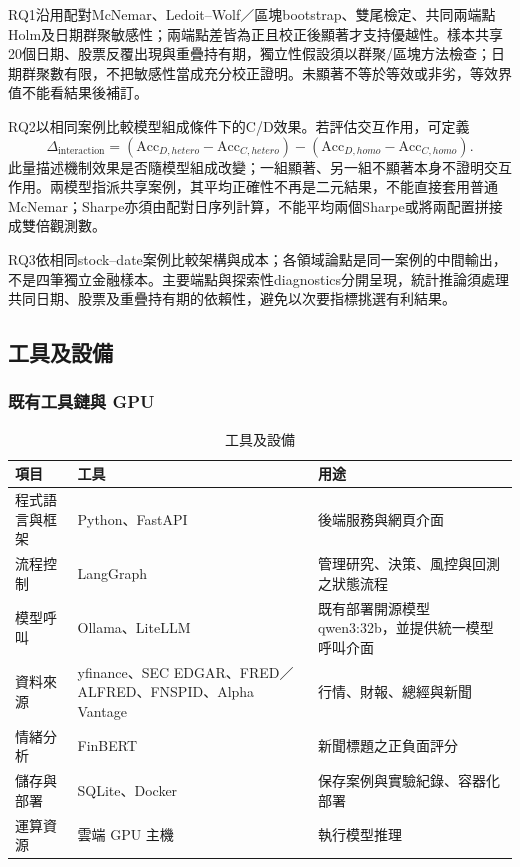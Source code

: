 \documentclass[12pt,a4paper]{article}
\begin{document}
\begin{CJK}{UTF8}{bkai}
RQ1沿用配對McNemar、Ledoit--Wolf／區塊bootstrap、雙尾檢定、共同兩端點Holm及日期群聚敏感性；兩端點差皆為正且校正後顯著才支持優越性。樣本共享20個日期、股票反覆出現與重疊持有期，獨立性假設須以群聚/區塊方法檢查；日期群聚數有限，不把敏感性當成充分校正證明。未顯著不等於等效或非劣，等效界值不能看結果後補訂。

RQ2以相同案例比較模型組成條件下的C/D效果。若評估交互作用，可定義
\[
\Delta_{\mathrm{interaction}}=(\mathrm{Acc}_{D,hetero}-\mathrm{Acc}_{C,hetero})-(\mathrm{Acc}_{D,homo}-\mathrm{Acc}_{C,homo}).
\]
此量描述機制效果是否隨模型組成改變；一組顯著、另一組不顯著本身不證明交互作用。兩模型指派共享案例，其平均正確性不再是二元結果，不能直接套用普通McNemar；Sharpe亦須由配對日序列計算，不能平均兩個Sharpe或將兩配置拼接成雙倍觀測數。

RQ3依相同stock--date案例比較架構與成本；各領域論點是同一案例的中間輸出，不是四筆獨立金融樣本。主要端點與探索性diagnostics分開呈現，統計推論須處理共同日期、股票及重疊持有期的依賴性，避免以次要指標挑選有利結果。

\subsection{工具及設備}

\subsubsection{既有工具鏈與 GPU}
\begin{table}[H]
\centering\small
\caption{工具及設備}
\label{tab:tools}
\begin{tabularx}{\textwidth}{@{}l Y Y@{}}
\toprule
項目 & 工具 & 用途 \\
\midrule
程式語言與框架 & Python、FastAPI & 後端服務與網頁介面 \\
流程控制 & LangGraph & 管理研究、決策、風控與回測之狀態流程 \\
模型呼叫 & Ollama、LiteLLM & 既有部署開源模型qwen3:32b，並提供統一模型呼叫介面 \\
資料來源 & yfinance、\allowbreak SEC EDGAR、\allowbreak FRED／ALFRED、\allowbreak FNSPID、\allowbreak Alpha Vantage &行情、財報、總經與新聞 \\
情緒分析 & FinBERT & 新聞標題之正負面評分 \\
儲存與部署 & SQLite、Docker & 保存案例與實驗紀錄、容器化部署 \\
運算資源 & 雲端 GPU 主機 & 執行模型推理 \\
\bottomrule
\end{tabularx}
\end{table}

\end{CJK}
\end{document}
